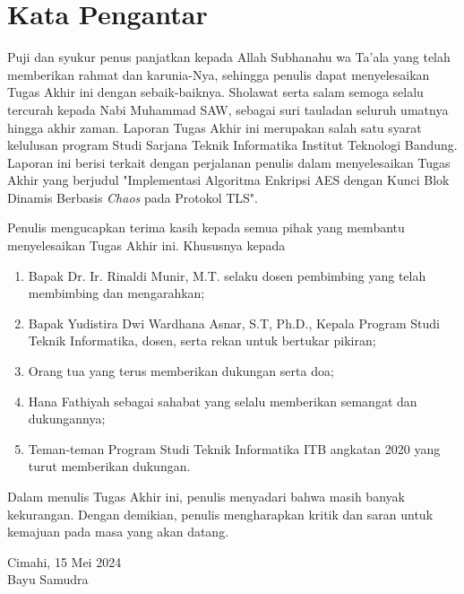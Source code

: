 \chapter*{Kata Pengantar}

Puji dan syukur penus panjatkan kepada Allah Subhanahu wa Ta'ala yang telah memberikan rahmat dan karunia-Nya, sehingga penulis dapat menyelesaikan Tugas Akhir ini dengan sebaik-baiknya. Sholawat serta salam semoga selalu tercurah kepada Nabi Muhammad SAW, sebagai suri tauladan seluruh umatnya hingga akhir zaman. Laporan Tugas Akhir ini merupakan salah satu syarat kelulusan program Studi Sarjana Teknik Informatika Institut Teknologi Bandung. Laporan ini berisi terkait dengan perjalanan penulis dalam menyelesaikan Tugas Akhir yang berjudul "Implementasi Algoritma Enkripsi AES dengan Kunci Blok Dinamis Berbasis \emph{Chaos} pada Protokol TLS".

Penulis mengucapkan terima kasih kepada semua pihak yang membantu menyelesaikan Tugas Akhir ini. Khususnya kepada
\begin{enumerate}
  \item Bapak Dr. Ir. Rinaldi Munir, M.T. selaku dosen pembimbing yang telah membimbing dan mengarahkan;
  \item Bapak Yudistira Dwi Wardhana Asnar, S.T, Ph.D., Kepala Program Studi Teknik Informatika, dosen, serta rekan untuk bertukar pikiran;
  \item Orang tua yang terus memberikan dukungan serta doa;
  \item Hana Fathiyah sebagai sahabat yang selalu memberikan semangat dan dukungannya;
  \item Teman-teman Program Studi Teknik Informatika ITB angkatan 2020 yang turut memberikan dukungan.
\end{enumerate}

Dalam menulis Tugas Akhir ini, penulis menyadari bahwa masih banyak kekurangan. Dengan demikian, penulis mengharapkan kritik dan saran untuk kemajuan pada masa yang akan datang.

\begin{flushright}
  Cimahi, 15 Mei 2024 \\


  Bayu Samudra
\end{flushright}